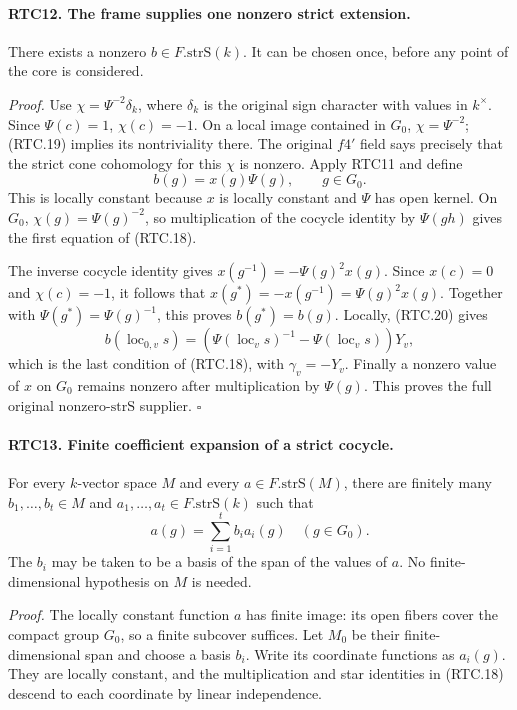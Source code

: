 \documentclass[11pt,a4paper]{article}
\numberwithin{equation}{section}
\theoremstyle{remark}\newtheorem{remark}[theorem]{Remark}
\begin{document}
\paragraph{RTC12. The frame supplies one nonzero strict extension.}
\label{claim:RTC12}
There exists a nonzero \(b\in F.\mathrm{strS}(k)\).  It can
be chosen once, before any point of the core is considered.

\emph{Proof.}
Use
\(\chi=\Psi^{-2}\delta_k\), where \(\delta_k\) is the
original sign character with values in \(k^\times\).  Since
\(\Psi(c)=1\), \(\chi(c)=-1\).  On a local image contained
in \(G_0\), \(\chi=\Psi^{-2}\); (RTC.19) implies its
nontriviality there.  The original \(f4'\) field says precisely
that the strict cone cohomology for this \(\chi\) is nonzero.
Apply RTC11 and define
\[
 b(g)=x(g)\Psi(g),\qquad g\in G_0.
                                                        \tag{RTC.22}
\]
This is locally constant because \(x\) is locally constant and
\(\Psi\) has open kernel.  On \(G_0\), \(\chi(g)=\Psi(g)^{-2}\),
so multiplication of the cocycle identity by \(\Psi(gh)\)
gives the first equation of (RTC.18).

The inverse cocycle identity gives
\(x(g^{-1})=-\Psi(g)^2x(g)\).  Since \(x(c)=0\) and
\(\chi(c)=-1\), it follows that
\(x(g^*)=-x(g^{-1})=\Psi(g)^2x(g)\).  Together with
\(\Psi(g^*)=\Psi(g)^{-1}\), this proves \(b(g^*)=b(g)\).
Locally, (RTC.20) gives
\[
 b(\operatorname{loc}_{0,v}s)
  =(\Psi(\operatorname{loc}_v s)^{-1}
       -\Psi(\operatorname{loc}_v s))Y_v,
\]
which is the last condition of (RTC.18), with \(\gamma_v=-Y_v\).
Finally a nonzero value of \(x\) on \(G_0\) remains nonzero
after multiplication by \(\Psi(g)\).  This proves the full
original nonzero-\(\mathrm{strS}\) supplier. \hfill\(\square\)

\paragraph{RTC13. Finite coefficient expansion of a strict cocycle.}
\label{claim:RTC13}
For every \(k\)-vector space \(M\) and every
\(a\in F.\mathrm{strS}(M)\), there are finitely many
\(b_1,\ldots,b_t\in M\) and
\(a_1,\ldots,a_t\in F.\mathrm{strS}(k)\) such that
\[
 a(g)=\sum_{i=1}^t b_i a_i(g)\quad(g\in G_0).
                                                        \tag{RTC.23}
\]
The \(b_i\) may be taken to be a basis of the span of the values
of \(a\).  No finite-dimensional hypothesis on \(M\) is needed.

\emph{Proof.}
The locally constant function \(a\) has finite image: its open
fibers cover the compact group \(G_0\), so a finite subcover
suffices.  Let \(M_0\) be their finite-dimensional span and choose
a basis \(b_i\).  Write its coordinate functions as \(a_i(g)\).
They are locally constant, and the multiplication and star identities
in (RTC.18) descend to each coordinate by linear independence.
\end{document}
